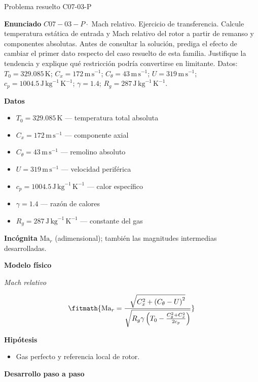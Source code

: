 \documentclass[10pt,openany]{book}
\begin{document}
\begin{studiumworked}{Problema resuelto C07-03-P}


\noindent\textbf{Enunciado}
\(C07-03-P \cdot\) Mach relativo. Ejercicio de transferencia. Calcule temperatura estática de entrada y Mach relativo del rotor a partir de remanso y componentes absolutas. Antes de consultar la solución, prediga el efecto de cambiar el primer dato respecto del caso resuelto de esta familia. Justifique la tendencia y explique qué restricción podría convertirse en limitante. Datos: \(T_0=329.085\, \mathrm{K}\); \(C_x=172\, \mathrm{m}\,\mathrm{s}^{-1}\); \(C_\theta=43\, \mathrm{m}\,\mathrm{s}^{-1}\); \(U=319\, \mathrm{m}\,\mathrm{s}^{-1}\); \(c_p=1004.5\, \mathrm{J}\,\mathrm{kg}^{-1}\,\mathrm{K}^{-1}\); \(\gamma=1.4\); \(R_g=287\, \mathrm{J}\,\mathrm{kg}^{-1}\,\mathrm{K}^{-1}\).

\noindent\textbf{Datos}
\begin{itemize}
\item $T_0 = 329.085\,\mathrm{K}$ — temperatura total absoluta
\item $C_x = 172\,\mathrm{m}\,\mathrm{s}^{-1}$ — componente axial
\item $C_\theta = 43\,\mathrm{m}\,\mathrm{s}^{-1}$ — remolino absoluto
\item $U = 319\,\mathrm{m}\,\mathrm{s}^{-1}$ — velocidad periférica
\item $c_p = 1004.5\,\mathrm{J}\,\mathrm{kg}^{-1}\,\mathrm{K}^{-1}$ — calor específico
\item $\gamma = 1.4$ — razón de calores
\item $R_g = 287\,\mathrm{J}\,\mathrm{kg}^{-1}\,\mathrm{K}^{-1}$ — constante del gas
\end{itemize}

\noindent\textbf{Incógnita}
$\mathrm{Ma}_r$ (adimensional); también las magnitudes intermedias desarrolladas.

\noindent\textbf{Modelo físico}

\noindent\textit{Mach relativo}

\[
\fitmath{\mathrm{Ma}_r=\frac{\sqrt{C_x^{2} + \left(C_\theta - U\right)^{2}}}{\sqrt{R_g \gamma \left(T_0 - \frac{C_\theta^{2} + C_x^{2}}{2 c_p}\right)}}}
\]

\noindent\textbf{Hipótesis}
\begin{itemize}
\item Gas perfecto y referencia local de rotor.
\end{itemize}

\noindent\textbf{Desarrollo paso a paso}


\end{studiumworked}
\end{document}
